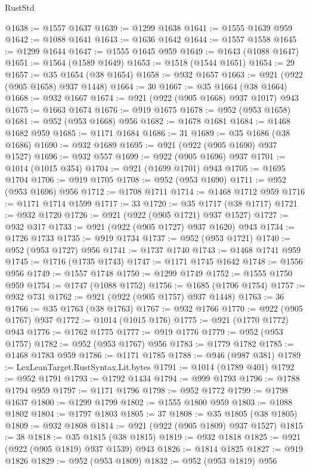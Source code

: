 \begin{lexlean}{RustStd}
\begin{coremodule}
@1638 := @1557 @1637
@1639 := @1299 @1638
@1641 := @1555 @1639 @959
@1642 := @1088 @1641
@1643 := @1636 @1642
@1644 := @1557 @1558
@1645 := @1299 @1644
@1647 := @1555 @1645 @959
@1649 := @1643 (@1088 @1647)
@1651 := @1564 (@1589 @1649)
@1653 := @1518 (@1544 @1651)
@1654 := 29
@1657 := @35 @1654 (@38 @1654)
@1658 := @932 @1657
@1663 := @921 (@922 (@905 @1658) @937 @1448)
@1664 := 30
@1667 := @35 @1664 (@38 @1664)
@1668 := @932 @1667
@1674 := @921 (@922 (@905 @1668) @937 @1017) @943
@1675 := @1663 @1674
@1676 := @919 @1675
@1678 := @952 (@953 @1658)
@1681 := @952 (@953 @1668) @956
@1682 := @1678 @1681
@1684 := @1468 @1682 @959
@1685 := @1171 @1684
@1686 := 31
@1689 := @35 @1686 (@38 @1686)
@1690 := @932 @1689
@1695 := @921 (@922 (@905 @1690) @937 @1527)
@1696 := @932 @557
@1699 := @922 (@905 @1696) @937
@1701 := @1014 (@1015 @354)
@1704 := @921 (@1699 @1701) @943
@1705 := @1695 @1704
@1706 := @919 @1705
@1708 := @952 (@953 @1690)
@1711 := @952 (@953 @1696) @956
@1712 := @1708 @1711
@1714 := @1468 @1712 @959
@1716 := @1171 @1714 @1599
@1717 := 33
@1720 := @35 @1717 (@38 @1717)
@1721 := @932 @1720
@1726 := @921 (@922 (@905 @1721) @937 @1527)
@1727 := @932 @317
@1733 := @921 (@922 (@905 @1727) @937 @1620) @943
@1734 := @1726 @1733
@1735 := @919 @1734
@1737 := @952 (@953 @1721)
@1740 := @952 (@953 @1727) @956
@1741 := @1737 @1740
@1743 := @1468 @1741 @959
@1745 := @1716 (@1735 @1743)
@1747 := @1171 @1745 @1642
@1748 := @1556 @956
@1749 := @1557 @1748
@1750 := @1299 @1749
@1752 := @1555 @1750 @959
@1754 := @1747 (@1088 @1752)
@1756 := @1685 (@1706 @1754)
@1757 := @932 @731
@1762 := @921 (@922 (@905 @1757) @937 @1448)
@1763 := 36
@1766 := @35 @1763 (@38 @1763)
@1767 := @932 @1766
@1770 := @922 (@905 @1767) @937
@1772 := @1014 (@1015 @176)
@1775 := @921 (@1770 @1772) @943
@1776 := @1762 @1775
@1777 := @919 @1776
@1779 := @952 (@953 @1757)
@1782 := @952 (@953 @1767) @956
@1783 := @1779 @1782
@1785 := @1468 @1783 @959
@1786 := @1171 @1785
@1788 := @946 (@987 @381)
@1789 := LexLeanTarget.RustSyntax.Lit.bytes
@1791 := @1014 (@1789 @401)
@1792 := @952 @1791
@1793 := @1792 @1434
@1794 := @999 @1793
@1796 := @1788 @1794 @959
@1797 := @1171 @1796
@1798 := @952 @1772
@1799 := @1798 @1637
@1800 := @1299 @1799
@1802 := @1555 @1800 @959
@1803 := @1088 @1802
@1804 := @1797 @1803
@1805 := 37
@1808 := @35 @1805 (@38 @1805)
@1809 := @932 @1808
@1814 := @921 (@922 (@905 @1809) @937 @1527)
@1815 := 38
@1818 := @35 @1815 (@38 @1815)
@1819 := @932 @1818
@1825 := @921 (@922 (@905 @1819) @937 @1539) @943
@1826 := @1814 @1825
@1827 := @919 @1826
@1829 := @952 (@953 @1809)
@1832 := @952 (@953 @1819) @956

\end{coremodule}
\end{lexlean}
